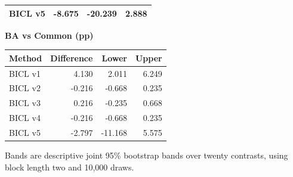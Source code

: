 \begin{table}[htb]
\begin{minipage}[t]{0.48\textwidth}
\begin{tabular}{lrrr}
BICL v5 & -8.675 & -20.239 & 2.888 \\
\hline
\end{tabular}
\end{minipage}\hfill
\begin{minipage}[t]{0.48\textwidth}
\centering
\textbf{BA vs Common (pp)}\par\smallskip
\begin{tabular}{lrrr}
\hline
Method & Difference & Lower & Upper \\
\hline
BICL v1 & 4.130 & 2.011 & 6.249 \\
BICL v2 & -0.216 & -0.668 & 0.235 \\
BICL v3 & 0.216 & -0.235 & 0.668 \\
BICL v4 & -0.216 & -0.668 & 0.235 \\
BICL v5 & -2.797 & -11.168 & 5.575 \\
\hline
\end{tabular}
\end{minipage}\par\medskip
\begin{minipage}{\textwidth}\footnotesize Bands are descriptive joint 95\% bootstrap bands over twenty contrasts, using block length two and 10,000 draws.\end{minipage}
\end{table}
